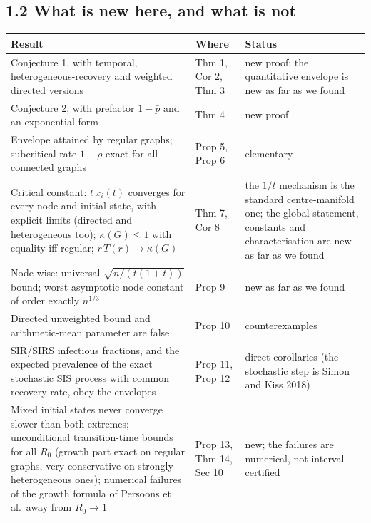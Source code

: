 \documentclass[
  11pt,
  a4paper,
]{article}
\newcounter{none} %
\begin{document}
\subsection{1.2 What is new here, and what is
not}\label{what-is-new-here-and-what-is-not}

{\def\LTcaptype{none} %
\begin{longtable}[]{@{}
  >{\raggedright\arraybackslash}p{}
  >{\raggedright\arraybackslash}p{}
  >{\raggedright\arraybackslash}p{}@{}}
\toprule\noalign{}
\begin{minipage}[b]{\linewidth}\raggedright
Result
\end{minipage} & \begin{minipage}[b]{\linewidth}\raggedright
Where
\end{minipage} & \begin{minipage}[b]{\linewidth}\raggedright
Status
\end{minipage} \\
\midrule\noalign{}
\endhead
\bottomrule\noalign{}
\endlastfoot
Conjecture 1, with temporal, heterogeneous-recovery and weighted
directed versions & Thm 1, Cor 2, Thm 3 & new proof; the quantitative
envelope is new as far as we found \\
Conjecture 2, with prefactor \(1-\bar p\) and an exponential form & Thm
4 & new proof \\
Envelope attained by regular graphs; subcritical rate \(1-\rho\) exact
for all connected graphs & Prop 5, Prop 6 & elementary \\
Critical constant: \(t\,x_i(t)\) converges for every node and initial
state, with explicit limits (directed and heterogeneous too);
\(\kappa(G)\le1\) with equality iff regular; \(r\,T(r)\to\kappa(G)\) &
Thm 7, Cor 8 & the \(1/t\) mechanism is the standard centre-manifold
one; the global statement, constants and characterisation are new as far
as we found \\
Node-wise: universal \(\sqrt{n/(t(1+t))}\) bound; worst asymptotic node
constant of order exactly \(n^{1/3}\) & Prop 9 & new as far as we
found \\
Directed unweighted bound and arithmetic-mean parameter are false & Prop
10 & counterexamples \\
SIR/SIRS infectious fractions, and the expected prevalence of the exact
stochastic SIS process with common recovery rate, obey the envelopes &
Prop 11, Prop 12 & direct corollaries (the stochastic step is Simon and
Kiss 2018) \\
Mixed initial states never converge slower than both extremes;
unconditional transition-time bounds for all \(R_0\) (growth part exact
on regular graphs, very conservative on strongly heterogeneous ones);
numerical failures of the growth formula of Persoons et al.~away from
\(R_0\to1\) & Prop 13, Thm 14, Sec 10 & new; the failures are numerical,
not interval-certified \\
\end{longtable}
}
\end{document}
